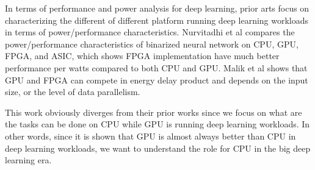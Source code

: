 In terms of performance and power analysis for deep learning, prior arts focus on characterizing the different of different platform running deep learning workloads in terms of power/performance characteristics. Nurvitadhi et al \cite{nurvitadhi2016accelerating} compares the power/performance characteristics of binarized neural network on CPU, GPU, FPGA, and ASIC, which shows FPGA implementation have much better performance per watts compared to both CPU and GPU. Malik et al \cite{malik2016architecture} shows that GPU and FPGA can compete  in energy delay product and depends on the input size, or the level of data parallelism.

This work obviously diverges from their prior works since we focus on what are the tasks can be done on CPU while GPU is running deep learning workloads. In other words, since it is shown that GPU is almost always better than CPU in deep learning workloads, we want to understand the role for CPU in the big deep learning era.
